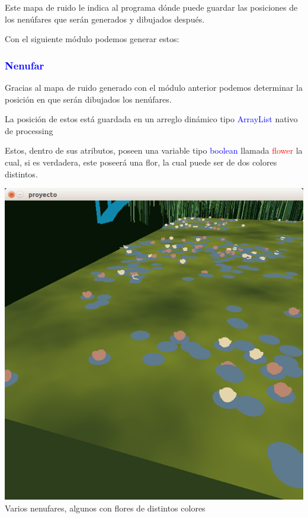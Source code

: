 \documentclass[11pt,a4paper]{article}
\begin{document}
			Este mapa de ruido le indica al programa dónde puede guardar las posiciones de los nenúfares que serán generados y dibujados después.

			Con el siguiente módulo podemos generar estos:

		\subsubsection{\textcolor{blue}{Nenufar}}

			Gracias al mapa de ruido generado con el módulo anterior podemos determinar la posición en que serán dibujados los nenúfares.

			La posición de estos está guardada en un arreglo dinámico tipo \textcolor{blue}{ArrayList} nativo de processing

			Estos, dentro de sus atributos, poseen una variable tipo \textcolor{blue}{boolean} llamada \textcolor{red}{flower} la cual, si es verdadera, este poseerá una flor, la cual puede ser de dos colores distintos.

			\begin{center}
			\includegraphics[scale = .5]{CAP4}\\
			{\tiny Varios nenufares, algunos con flores de distintos colores}\\
			\end{center}
\end{document}
